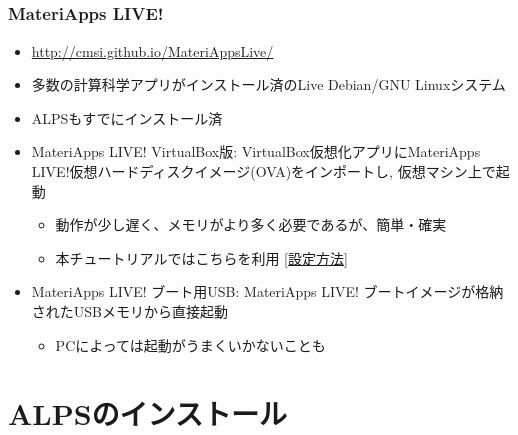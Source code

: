 \subsection*{\redb\whiteb\greenb}
\begin{frame}
 \frametitle{MateriApps LIVE!}
 \begin{itemize}
   \item \url{http://cmsi.github.io/MateriAppsLive/}
   \item 多数の計算科学アプリがインストール済のLive Debian/GNU Linuxシステム
   \item ALPSもすでにインストール済
   \item MateriApps LIVE! VirtualBox版: VirtualBox仮想化アプリにMateriApps LIVE!仮想ハードディスクイメージ(OVA)をインポートし, 仮想マシン上で起動
     \begin{itemize}
     \item 動作が少し遅く、メモリがより多く必要であるが、簡単・確実
     \item \alert{本チュートリアルではこちらを利用} [\href{https://www.slideshare.net/cms\_initiative/materiapps-live-65694832}{設定方法}]
     \end{itemize}
   \item MateriApps LIVE! ブート用USB: MateriApps LIVE! ブートイメージが格納されたUSBメモリから直接起動
     \begin{itemize}
     \item PCによっては起動がうまくいかないことも
     \end{itemize}
 \end{itemize}
\end{frame}

\section{ALPSのインストール}

